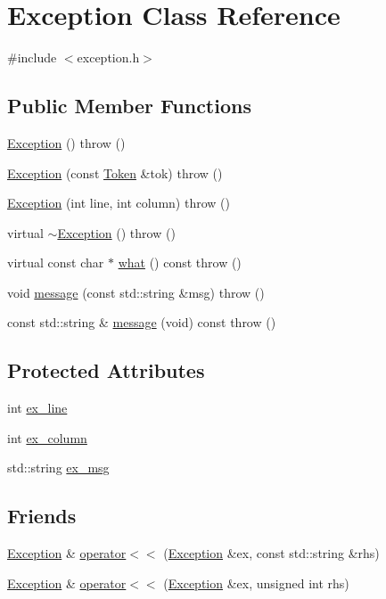 \hypertarget{class_exception}{\section{Exception Class Reference}
\label{class_exception}
}


{\ttfamily \#include $<$exception.\-h$>$}

\subsection*{Public Member Functions}
\begin{DoxyCompactItemize}
\item 
\hyperlink{class_exception_a1b78336bb26edf8e784783cc150c5801}{Exception} ()  throw ()
\item 
\hyperlink{class_exception_abfa91380075acb0b040b401ace9885d8}{Exception} (const \hyperlink{class_token}{Token} \&tok)  throw ()
\item 
\hyperlink{class_exception_aa049354d27370ca0176a16c5ed7394e9}{Exception} (int line, int column)  throw ()
\item 
virtual \hyperlink{class_exception_ad1ba411de295ef2eeb02ba26284a829a}{$\sim$\-Exception} ()  throw ()
\item 
virtual const char $\ast$ \hyperlink{class_exception_a380f0477d9ef319911e7a8167bd47f1f}{what} () const   throw ()
\item 
void \hyperlink{class_exception_a2514fc52bf060e2d242f5e6f1b87e8bf}{message} (const std\-::string \&msg)  throw ()
\item 
const std\-::string \& \hyperlink{class_exception_a8f4eb20583b892ce7b0fb55554a94156}{message} (void) const   throw ()
\end{DoxyCompactItemize}
\subsection*{Protected Attributes}
\begin{DoxyCompactItemize}
\item 
int \hyperlink{class_exception_ab30bf54ebcf9ead45300ce422fb4b6b8}{ex\-\_\-line}
\item 
int \hyperlink{class_exception_a5a08b0f7c24a639573c36ace567348c4}{ex\-\_\-column}
\item 
std\-::string \hyperlink{class_exception_ac106ae3b8d10ae97ee0b71a270fbda27}{ex\-\_\-msg}
\end{DoxyCompactItemize}
\subsection*{Friends}
\begin{DoxyCompactItemize}
\item 
\hyperlink{class_exception}{Exception} \& \hyperlink{class_exception_a14ad8d29bc8d9f4eb8d2a0b0e5b1047f}{operator$<$$<$} (\hyperlink{class_exception}{Exception} \&ex, const std\-::string \&rhs)
\item 
\hyperlink{class_exception}{Exception} \& \hyperlink{class_exception_a96bb231c8f8c68239c83b6fa691e02b4}{operator$<$$<$} (\hyperlink{class_exception}{Exception} \&ex, unsigned int rhs)
\end{DoxyCompactItemize}


